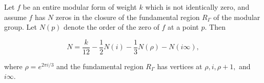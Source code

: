 Let $f$ be an entire modular form of weight $k$ which is not identically zero, and assume $f$ has $N$ zeros in the closure of the fundamental region $R_\Gamma$ of the modular group. Let $N(p)$ denote the order of the zero of $f$ at a point $p$. Then

$$N = \frac{k}{12} - \frac{1}{2} N(i) - \frac{1}{3} N(\rho) - N(i\infty),$$

where $\rho = e^{2\pi i/3}$ and the fundamental region $R_\Gamma$ has vertices at $\rho, i, \rho+1,$ and $i\infty$.
